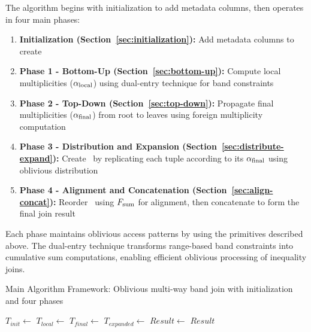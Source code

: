 The algorithm begins with initialization to add metadata columns, then operates in four main phases:

\begin{enumerate}
\item \textbf{Initialization (Section~\ref{sec:initialization}):} Add metadata columns to create \augmentedtables
\item \textbf{Phase 1 - Bottom-Up (Section~\ref{sec:bottom-up}):} Compute local multiplicities ($\alpha_{\text{local}}$) using dual-entry technique for band constraints
\item \textbf{Phase 2 - Top-Down (Section~\ref{sec:top-down}):} Propagate final multiplicities ($\alpha_{\text{final}}$) from root to leaves using foreign multiplicity computation
\item \textbf{Phase 3 - Distribution and Expansion (Section~\ref{sec:distribute-expand}):} Create \expandedtables\ by replicating each tuple according to its $\alpha_{\text{final}}$ using oblivious distribution
\item \textbf{Phase 4 - Alignment and Concatenation (Section~\ref{sec:align-concat}):} Reorder \expandedtables\ using $F_{\text{sum}}$ for alignment, then concatenate to form the final join result
\end{enumerate}

Each phase maintains oblivious access patterns by using the primitives described above. The dual-entry technique transforms range-based band constraints into cumulative sum computations, enabling efficient oblivious processing of inequality joins.

\begin{algorithm}[H]
\caption{Main Algorithm Framework: Oblivious multi-way band join with initialization and four phases}
\label{alg:main}
\begin{algorithmic}[1]
    \State $T_{init} \leftarrow$  
    \State $T_{local} \leftarrow$  
    \State $T_{final} \leftarrow$  
    \State $T_{expanded} \leftarrow$  
    \State $Result \leftarrow$  
    \State \Return $Result$ 
\EndFunction
\end{algorithmic}
\end{algorithm}

